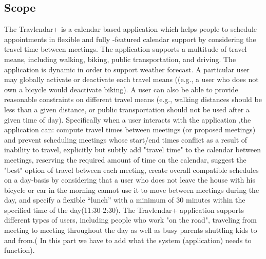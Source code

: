 \documentclass[12pt]{article}
\begin{document}
\subsection{Scope}
The Travlendar+ is  a calendar based application which helps people to schedule appointments in flexible and fully -featured calendar support by considering the travel time between meetings. The application supports a multitude of travel means, including walking, biking, public transportation, and driving. The application is dynamic in order to support weather forecast. A particular user may globally activate or deactivate each travel means ((e.g., a user who does not own a bicycle would deactivate biking). A user can also be able to provide reasonable constraints on different travel means (e.g., walking distances should be less than a given distance, or public transportation should not be used after a given time of day). 
Specifically  when a user interacts with the application ,the application can: compute travel times between meetings (or proposed meetings) and prevent scheduling meetings whose start/end times conflict as a result of inability to travel, explicitly but subtly add "travel time" to the calendar between meetings, reserving the required amount of time on the calendar, suggest  the "best" option of travel between each meeting, create overall compatible schedules on a day-basis by considering that a user who does not leave the house with his bicycle or car in the morning cannot use it to move between meetings during the day, and specify a flexible “lunch” with a minimum of 30 minutes within the specified time of the day(11:30-2:30).
The Travlendar+ application supports different types of users, including people who work "on the road", traveling from meeting to meeting throughout the day as well as busy parents shuttling kids to and from.( In this part we have to add what the system (application) needs to function).
\end{document}
